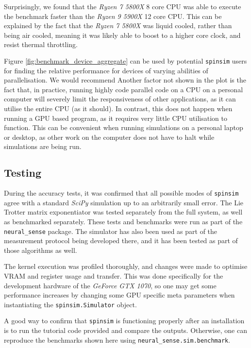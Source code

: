 \documentclass{jors}
\begin{document}
		Surprisingly, we found that the \emph{Ryzen 7 5800X} 8 core CPU was able to execute the benchmark faster than the \emph{Ryzen 9 5900X} 12 core CPU. This can be explained by the fact that the \emph{Ryzen 7 5800X} was liquid cooled, rather than being air cooled, meaning it was likely able to boost to a higher core clock, and resist thermal throttling.

		Figure \ref{fig:benchmark_device_aggregate} can be used by potential \texttt{spinsim} users for finding the relative performance for devices of varying abilities of parallelisation. We would recommend Another factor not shown in the plot is the fact that, in practice, running highly code parallel code on a CPU on a personal computer will severely limit the responsiveness of other applications, as it can utilise the entire CPU (as it should). In contrast, this does not happen when running a GPU based program, as it requires very little CPU utilisation to function. This can be convenient when running simulations on a personal laptop or desktop, as other work on the computer does not have to halt while simulations are being run.

	\subsection{Testing}
		During the accuracy tests, it was confirmed that all possible modes of \texttt{spinsim} agree with a standard \emph{SciPy} simulation up to an arbitrarily small error. The Lie Trotter matrix exponentiator was tested separately from the full system, as well as benchmarked separately. These tests and benchmarks were run as part of the \texttt{neural\_sense} package. The simulator has also been used as part of the measurement protocol being developed there, and it has been tested as part of those algorithms as well.

		The kernel execution was profiled thoroughly, and changes were made to optimise VRAM and register usage and transfer. This was done specifically for the development hardware of the \emph{GeForce GTX 1070}, so one may get some performance increases by changing some GPU specific meta parameters when instantiating the \texttt{spinsim.Simulator} object.

		A good way to confirm that \texttt{spinsim} is functioning properly after an installation is to run the tutorial code provided and compare the outputs. Otherwise, one can reproduce the benchmarks shown here using \texttt{neural\_sense.sim.benchmark}.
\end{document}
